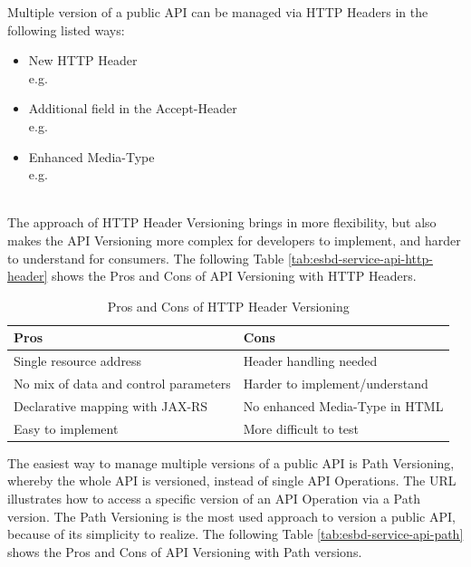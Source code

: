 Multiple version of a public API can be managed via HTTP Headers in the following listed ways:
\begin{itemize}
	\item New HTTP Header \\
	e.g. 
	\item Additional field in the Accept-Header \\
	e.g. 
	\item Enhanced Media-Type \\
	e.g. 
\end{itemize}
\ \\
The approach of HTTP Header Versioning brings in more flexibility, but also makes the API Versioning more complex for developers to implement, and harder to understand for consumers. The following Table \vref{tab:esbd-service-api-http-header} shows the Pros and Cons of API Versioning with HTTP Headers.

{\renewcommand{\arraystretch}{1.2}%
\begin{table}[h]
	\begin{tabularx}{\textwidth}{ X|X }	
		\textbf{Pros}                         & \textbf{Cons}    \\  \hline
		Single resource address               & Header handling needed     \\  
		No mix of data and control parameters & Harder to implement/understand     \\
		Declarative mapping with JAX-RS       & No enhanced Media-Type in HTML     \\
		Easy to implement                     & More difficult to test \\ \hline
	\end{tabularx}
	\caption{Pros and Cons of HTTP Header Versioning}
	\label{tab:esbd-service-api-http-header}
\end{table}}

The easiest way to manage multiple versions of a public API is Path Versioning, whereby the whole API is versioned, instead of single API Operations. The URL  illustrates how to access a specific version of an API Operation via a Path version. The Path Versioning is the most used approach to version a public API, because of its simplicity to realize.  The following Table \vref{tab:esbd-service-api-path} shows the Pros and Cons of API Versioning with Path versions.

